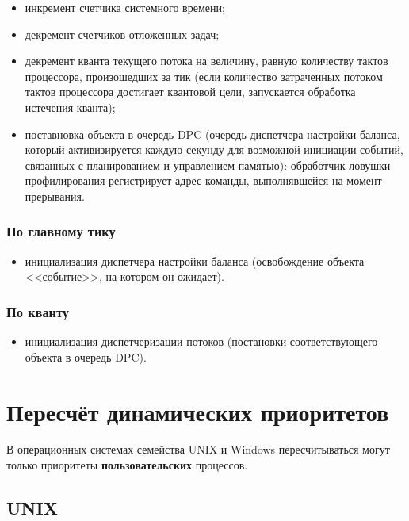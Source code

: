 \begin{itemize}
	\item инкремент счетчика системного времени;
	\item декремент счетчиков отложенных задач;
	\item декремент кванта текущего потока на величину, равную количеству тактов процессора, произошедших за тик (если количество затраченных потоком тактов процессора достигает квантовой цели, запускается обработка истечения кванта);
	\item поставновка объекта в очередь DPC (очередь диспетчера настройки баланса, который активизируется каждую секунду для возможной инициации собы­тий, связанных с планированием и управлением памятью): обработчик ловушки профилирования регистрирует адрес команды, выполнявшейся на момент прерывания.
\end{itemize}

\subsubsection*{По главному тику}

\begin{itemize}
	\item инициализация диспетчера настройки баланса (освобождение объекта <<событие>>, на котором он ожидает).
\end{itemize}

\subsubsection*{По кванту}

\begin{itemize}
	\item инициализация диспетчеризации потоков (постановки соответствующего объекта в очередь DPC).
\end{itemize}

\section{Пересчёт динамических приоритетов}

В операционных системах семейства UNIX и Windows пересчитываться могут только приоритеты \textbf{пользовательских} процессов.

\subsection{UNIX}

